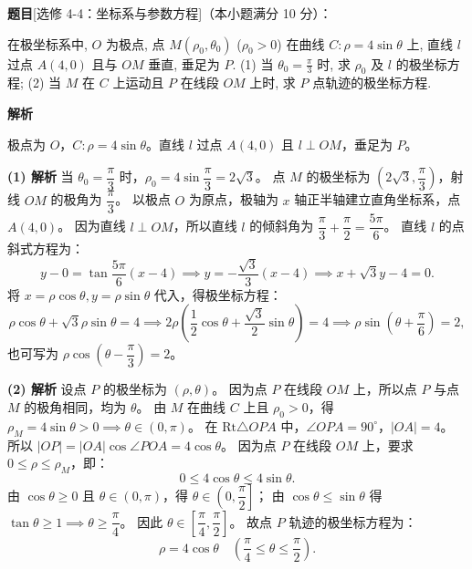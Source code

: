 \begin{answer}


\par\medskip

\end{answer}
\begin{answer}

\textbf{题目}[选修 4-4：坐标系与参数方程]（本小题满分 10 分）：

在极坐标系中, $O$ 为极点, 点 $M(\rho_0, \theta_0)$ ($\rho_0 > 0$) 在曲线 $C: \rho = 4\sin\theta$ 上, 直线 $l$ 过点 $A(4, 0)$ 且与 $OM$ 垂直, 垂足为 $P$.
(1) 当 $\theta_0 = \frac{\pi}{3}$ 时, 求 $\rho_0$ 及 $l$ 的极坐标方程;
(2) 当 $M$ 在 $C$ 上运动且 $P$ 在线段 $OM$ 上时, 求 $P$ 点轨迹的极坐标方程.

\textbf{解析}

极点为 $O$，$C: \rho = 4\sin\theta$。直线 $l$ 过点 $A(4, 0)$ 且 $l \perp OM$，垂足为 $P$。

\textbf{(1) 解析}
当 $\theta_0 = \dfrac{\pi}{3}$ 时，$\rho_0 = 4\sin\dfrac{\pi}{3} = 2\sqrt{3}$。
点 $M$ 的极坐标为 $\left(2\sqrt{3}, \dfrac{\pi}{3}\right)$，射线 $OM$ 的极角为 $\dfrac{\pi}{3}$。
以极点 $O$ 为原点，极轴为 $x$ 轴正半轴建立直角坐标系，点 $A(4, 0)$。
因为直线 $l \perp OM$，所以直线 $l$ 的倾斜角为 $\dfrac{\pi}{3} + \dfrac{\pi}{2} = \dfrac{5\pi}{6}$。
直线 $l$ 的点斜式方程为：
\nopagebreak[4]
\[y - 0 = \tan\frac{5\pi}{6}(x - 4) \implies y = -\frac{\sqrt{3}}{3}(x - 4) \implies x + \sqrt{3}y - 4 = 0.\]
将 $x = \rho\cos\theta, y = \rho\sin\theta$ 代入，得极坐标方程：
\nopagebreak[4]
\[\rho\cos\theta + \sqrt{3}\rho\sin\theta = 4 \implies 2\rho\left(\frac{1}{2}\cos\theta + \frac{\sqrt{3}}{2}\sin\theta\right) = 4 \implies \rho\sin\left(\theta + \frac{\pi}{6}\right) = 2,\]
也可写为 $\rho\cos\left(\theta - \dfrac{\pi}{3}\right) = 2$。

\textbf{(2) 解析}
设点 $P$ 的极坐标为 $(\rho, \theta)$。
因为点 $P$ 在线段 $OM$ 上，所以点 $P$ 与点 $M$ 的极角相同，均为 $\theta$。
由 $M$ 在曲线 $C$ 上且 $\rho_0 > 0$，得 $\rho_M = 4\sin\theta > 0 \implies \theta \in (0, \pi)$。
在 $\text{Rt}\triangle OPA$ 中，$\angle OPA = 90^\circ$，$|OA| = 4$。
所以 $|OP| = |OA|\cos\angle POA = 4\cos\theta$。
因为点 $P$ 在线段 $OM$ 上，要求 $0 \leqslant \rho \leqslant \rho_M$，即：
\nopagebreak[4]
\[0 \leqslant 4\cos\theta \leqslant 4\sin\theta.\]
由 $\cos\theta \geqslant 0$ 且 $\theta \in (0, \pi)$，得 $\theta \in \left(0, \dfrac{\pi}{2}\right]$；
由 $\cos\theta \leqslant \sin\theta$ 得 $\tan\theta \geqslant 1 \implies \theta \geqslant \dfrac{\pi}{4}$。
因此 $\theta \in \left[\dfrac{\pi}{4}, \dfrac{\pi}{2}\right]$。
故点 $P$ 轨迹的极坐标方程为：
\nopagebreak[4]
\[\rho = 4\cos\theta \quad \left(\frac{\pi}{4} \leqslant \theta \leqslant \frac{\pi}{2}\right).\]


\end{answer}

